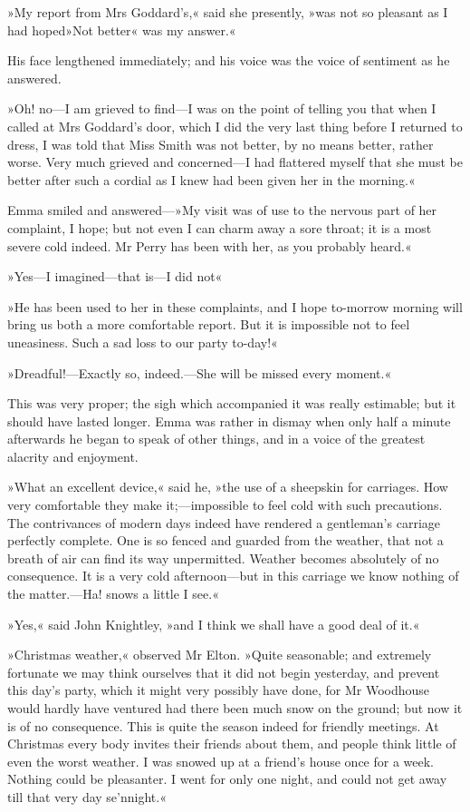 »My report from Mrs Goddard's,« said she presently, »was not so pleasant as I had hoped\longdash »Not better« was my answer.«

His face lengthened immediately; and his voice was the voice of sentiment as he answered.

»Oh! no—I am grieved to find—I was on the point of telling you that when I called at Mrs Goddard's door, which I did the very last thing before I returned to dress, I was told that Miss Smith was not better, by no means better, rather worse. Very much grieved and concerned—I had flattered myself that she must be better after such a cordial as I knew had been given her in the morning.«

Emma smiled and answered—»My visit was of use to the nervous part of her complaint, I hope; but not even I can charm away a sore throat; it is a most severe cold indeed. Mr Perry has been with her, as you probably heard.«

»Yes—I imagined—that is—I did not\longdash«

»He has been used to her in these complaints, and I hope to-morrow morning will bring us both a more comfortable report. But it is impossible not to feel uneasiness. Such a sad loss to our party to-day!«

»Dreadful!—Exactly so, indeed.—She will be missed every moment.«

This was very proper; the sigh which accompanied it was really estimable; but it should have lasted longer. Emma was rather in dismay when only half a minute afterwards he began to speak of other things, and in a voice of the greatest alacrity and enjoyment.

»What an excellent device,« said he, »the use of a sheepskin for carriages. How very comfortable they make it;—impossible to feel cold with such precautions. The contrivances of modern days indeed have rendered a gentleman's carriage perfectly complete. One is so fenced and guarded from the weather, that not a breath of air can find its way unpermitted. Weather becomes absolutely of no consequence. It is a very cold afternoon—but in this carriage we know nothing of the matter.—Ha! snows a little I see.«

»Yes,« said John Knightley, »and I think we shall have a good deal of it.«

»Christmas weather,« observed Mr Elton. »Quite seasonable; and extremely fortunate we may think ourselves that it did not begin yesterday, and prevent this day's party, which it might very possibly have done, for Mr Woodhouse would hardly have ventured had there been much snow on the ground; but now it is of no consequence. This is quite the season indeed for friendly meetings. At Christmas every body invites their friends about them, and people think little of even the worst weather. I was snowed up at a friend's house once for a week. Nothing could be pleasanter. I went for only one night, and could not get away till that very day se'nnight.«

